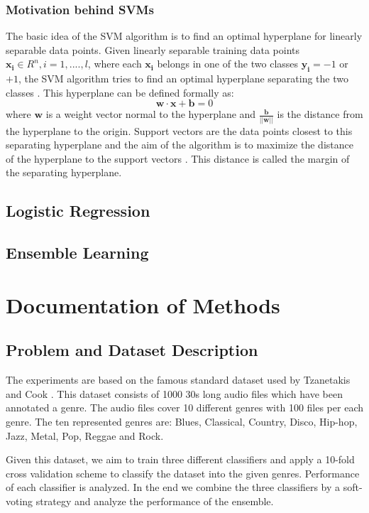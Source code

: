 \documentclass[a4paper,11pt,oneside]{article}
\begin{document}
\subsubsection*{Motivation behind SVMs}
The basic idea of the SVM algorithm is to find an optimal hyperplane for linearly separable data points.
Given linearly separable training data points $\mathbf{x_i}\in R^n,i=1,....,l$, where each $\mathbf{x_i}$
belongs in one of the two classes $\mathbf{y_i}=-1$ or $+1$, the SVM algorithm tries to find an optimal hyperplane
separating the two classes \cite{fletcher2009support}. This hyperplane can be defined formally as:
\begin{equation}
  \mathbf{w}\cdot\mathbf{x} + \mathbf{b} = 0
\end{equation} where $\mathbf{w}$ is a weight vector normal to the hyperplane and $\mathbf{\frac{b}{||w||}}$ 
is the distance from the hyperplane to the origin. Support vectors are the data points closest to this separating
hyperplane and the aim of the algorithm is to maximize the distance of the hyperplane to the support
vectors \cite{law2006simple}. This distance is called the margin of the separating hyperplane.

\subsection{Logistic Regression}
\subsection{Ensemble Learning}
\section{Documentation of Methods}
\subsection{Problem and Dataset Description}
The experiments are based on the famous standard dataset used by Tzanetakis and Cook \cite{tzan}.
This dataset consists of 1000 30s long audio files which have been annotated a genre. 
The audio files cover 10 different genres with 100 files per each genre. The ten represented genres
are: Blues, Classical, Country, Disco, Hip-hop, Jazz, Metal, Pop, Reggae and Rock.

Given this dataset, we aim to train three different classifiers and apply a 10-fold 
cross validation scheme to classify the dataset into the given genres. Performance of 
each classifier is analyzed. In the end we combine the three classifiers by a soft-voting 
strategy and analyze the performance of the ensemble. 
\end{document}
